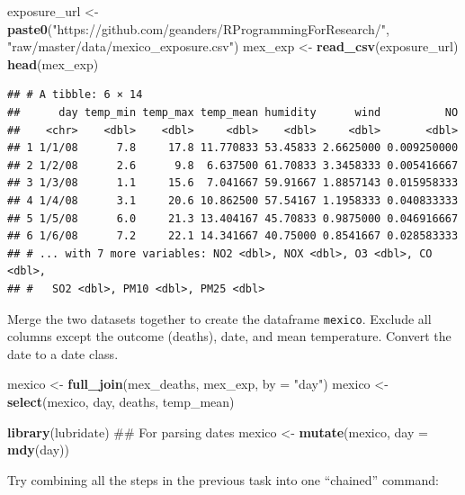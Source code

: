 \documentclass[]{book}
\makeatletter
\newenvironment{Shaded}{\begin{snugshade}}{\end{snugshade}}
\newcommand{\KeywordTok}[1]{\textcolor[rgb]{0.13,0.29,0.53}{\textbf{{#1}}}}
\newcommand{\DataTypeTok}[1]{\textcolor[rgb]{0.13,0.29,0.53}{{#1}}}
\newcommand{\StringTok}[1]{\textcolor[rgb]{0.31,0.60,0.02}{{#1}}}
\newcommand{\NormalTok}[1]{{#1}}
\newenvironment{kframe}{%
\medskip{}
\setlength{\fboxsep}{.8em}
 \def\at@end@of@kframe{}%
 \ifinner\ifhmode%
  \def\at@end@of@kframe{\end{minipage}}%
  \begin{minipage}{\columnwidth}%
 \fi\fi%
 \def\FrameCommand##1{\hskip\@totalleftmargin \hskip-\fboxsep
 \colorbox{shadecolor}{##1}\hskip-\fboxsep
     \hskip-\linewidth \hskip-\@totalleftmargin \hskip\columnwidth}%
 \MakeFramed {\advance\hsize-\width
   \@totalleftmargin\z@ \linewidth\hsize
   \@setminipage}}%
 {\par\unskip\endMakeFramed%
 \at@end@of@kframe}
\renewenvironment{Shaded}{\begin{kframe}}{\end{kframe}}
\makeatother
\begin{document}
\begin{Shaded}
\begin{Highlighting}[]
\NormalTok{exposure_url <-}\StringTok{ }\KeywordTok{paste0}\NormalTok{(}\StringTok{"https://github.com/geanders/RProgrammingForResearch/"}\NormalTok{,}
                       \StringTok{"raw/master/data/mexico_exposure.csv"}\NormalTok{)}
\NormalTok{mex_exp <-}\StringTok{ }\KeywordTok{read_csv}\NormalTok{(exposure_url)}
\KeywordTok{head}\NormalTok{(mex_exp)}
\end{Highlighting}
\end{Shaded}

\begin{verbatim}
## # A tibble: 6 × 14
##      day temp_min temp_max temp_mean humidity      wind          NO
##    <chr>    <dbl>    <dbl>     <dbl>    <dbl>     <dbl>       <dbl>
## 1 1/1/08      7.8     17.8 11.770833 53.45833 2.6625000 0.009250000
## 2 1/2/08      2.6      9.8  6.637500 61.70833 3.3458333 0.005416667
## 3 1/3/08      1.1     15.6  7.041667 59.91667 1.8857143 0.015958333
## 4 1/4/08      3.1     20.6 10.862500 57.54167 1.1958333 0.040833333
## 5 1/5/08      6.0     21.3 13.404167 45.70833 0.9875000 0.046916667
## 6 1/6/08      7.2     22.1 14.341667 40.75000 0.8541667 0.028583333
## # ... with 7 more variables: NO2 <dbl>, NOX <dbl>, O3 <dbl>, CO <dbl>,
## #   SO2 <dbl>, PM10 <dbl>, PM25 <dbl>
\end{verbatim}

Merge the two datasets together to create the dataframe \texttt{mexico}.
Exclude all columns except the outcome (deaths), date, and mean
temperature. Convert the date to a date class.

\begin{Shaded}
\begin{Highlighting}[]
\NormalTok{mexico <-}\StringTok{ }\KeywordTok{full_join}\NormalTok{(mex_deaths, mex_exp, }\DataTypeTok{by =} \StringTok{"day"}\NormalTok{) }
\NormalTok{mexico <-}\StringTok{ }\KeywordTok{select}\NormalTok{(mexico, day, deaths, temp_mean)}

\KeywordTok{library}\NormalTok{(lubridate) ## For parsing dates}
\NormalTok{mexico <-}\StringTok{ }\KeywordTok{mutate}\NormalTok{(mexico, }\DataTypeTok{day =} \KeywordTok{mdy}\NormalTok{(day))}
\end{Highlighting}
\end{Shaded}

Try combining all the steps in the previous task into one ``chained''
command:

\begin{Shaded}
\end{Shaded}
\end{document}
